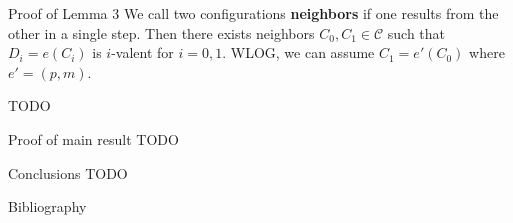 \documentclass[12pt]{beamer}
\begin{document}
  \begin{frame}{Proof of Lemma 3}
    We call two configurations \textbf{neighbors} if one results from the other
    in a single step. Then there exists neighbors \(C_0, C_1\in\mathcal{C}\)
    such that \(D_i = e(C_i)\) is \(i\)-valent for \(i = 0,1\). WLOG, we can
    assume \(C_1 = e'(C_0)\) where \(e' = (p, m)\).

    \vspace{0.25cm}

    TODO
  \end{frame}

  \begin{frame}{Proof of main result}
    TODO
  \end{frame}

  \begin{frame}{Conclusions}
    TODO
  \end{frame}

  \begin{frame}{Bibliography}
    
  \end{frame}
\end{document}
